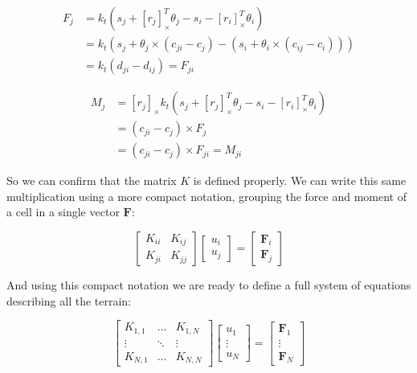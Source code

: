 \begin{equation}
\begin{split}
    F_j & = k_t(s_j + [r_j]_\times^T \theta_j - s_i - [r_i]_\times^T \theta_i) \\
    & = k_t(s_j + \theta_j \times (c_{ji} - c_j) - (s_i + \theta_i \times (c_{ij} - c_i)))  \\
    & = k_t(d_{ji} - d_{ij}) = F_{ji}
\end{split}
\end{equation}

\begin{equation}
\begin{split}
    M_j & = [r_j]_\times k_t(s_j + [r_j]_\times^T \theta_j - s_i - [r_i]_\times^T \theta_i) \\
    & = (c_{ji} - c_j) \times F_j \\
    & = (c_{ji} - c_j) \times F_{ji} = M_{ji}
\end{split}
\end{equation}

So we can confirm that the matrix $K$ is defined properly. We can write 
this same multiplication using a more compact notation, grouping the
force and moment of a cell in a single vector $\mathbf{F}$:

\begin{equation} \label{eq:EqSystem}
    \begin{bmatrix}
        K_{ii} & K_{ij} \\
        K_{ji} & K_{jj}
    \end{bmatrix}
    \begin{bmatrix}
        u_i \\
        u_j
    \end{bmatrix} =
    \begin{bmatrix}
        \mathbf{F}_i \\
        \mathbf{F}_j
    \end{bmatrix}
\end{equation}

And using this compact notation we are ready to define a full system 
of equations describing 
all the terrain:
 
\begin{equation}\label{eq:system}
    \begin{bmatrix}
        K_{1,1} & \hdots & K_{1,N} \\
        \vdots & \ddots & \vdots \\
        K_{N, 1} & \hdots & K_{N, N}
    \end{bmatrix}
    \begin{bmatrix}
        u_1 \\
        \vdots \\
        u_N
    \end{bmatrix} =
    \begin{bmatrix}
        \mathbf{F}_1 \\
        \vdots \\
        \mathbf{F}_N
    \end{bmatrix}
\end{equation}

